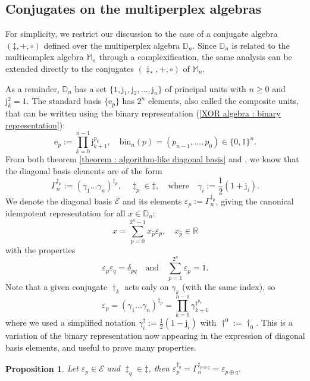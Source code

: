 \documentclass{article}
\newtheorem{proposition}[theorem]{Proposition}
\begin{document}
\subsection{Conjugates on the multiperplex algebras}

For simplicity, we restrict our discussion to the case of a conjugate algebra $(\ddagger, +, \circ)$ defined over the multiperplex algebra $\mathbb{D}_n$. Since $\mathbb{D}_n$ is related to the multicomplex algebra $\mathbb{M}_n$ through a complexification, the same analysis can be extended directly to the conjugates $(\ddagger_*, +,\circ)$ of $\mathbb{M}_n$.

As a reminder, $\mathbb{D}_n$ has a set $\{1, \mathrm{j}_1, \mathrm{j}_2, \ldots, \mathrm{j}_n\}$ of principal units with $n \geq 0$ and $\mathrm{j}_k^2 = 1$. The standard basis $\{ \mathrm{e}_p \}$ has $2^n$ elements, also called the composite units, that can be written using the binary representation (\ref{XOR algebra : binary representation}):
$$ \mathrm{e}_p := \prod_{k=0}^{n-1} \mathrm{j}_{k+1}^{p_k}, \quad \mathrm{bin}_n(p) = (p_{n-1}, \ldots, p_0) \in \{ 0,1 \}^n. $$
From both theorem \ref{theorem : algorithm-like diagonal basis} and \cite{courchesneAndTremblay2025}, we know that the diagonal basis elements are of the form
$$ \Gamma_n^{\ddagger_p} := (\gamma_1 \ldots \gamma_n)^{\ddagger_p}, \quad \ddagger_p \in \ddagger, \quad \text{where} \quad \gamma_i := \frac{1}{2}(1 + \mathrm{j}_i). $$
We denote the diagonal basis $\mathcal{E}$ and its elements $\varepsilon_p := \Gamma_n^{\ddagger_p}$, giving the canonical idempotent representation for all $x \in \mathbb{D}_n$: 
$$ x = \sum_{p=0}^{2^n-1} x_{\hat p} \varepsilon_p, \quad x_{\hat p} \in \mathbb{R} $$
with the properties
$$ \varepsilon_p \varepsilon_q = \delta_{pq} \quad \text{and} \quad \sum_{p=1}^{2^n} \varepsilon_p = 1. $$
Note that a given conjugate $\dagger_k$ acts only on $\gamma_k$ (with the same index), so
\begin{equation}
    \label{equation : binary representation for diagonal}
    \varepsilon_p = (\gamma_1 \ldots \gamma_n)^{\ddagger_p} = \prod_{k=0}^{n-1} \gamma_{k+1}^{\dagger^{p_k}}
\end{equation}
where we used a simplified notation $\gamma_i^{\dagger} := \frac{1}{2}(1 - \mathrm{j}_i)$ with $\dagger^0 := \dagger_0$. This is a variation of the binary representation now appearing in the expression of diagonal basis elements, and useful to prove many properties.
\begin{proposition}
    \label{proposition : diagonal basis and conjuagate XOR}
    Let $\varepsilon_p \in \mathcal{E}$ and $\ddagger_q \in \ddagger$, then $\varepsilon_p^{\ddagger_q} = \Gamma_n^{\ddagger_{p \oplus q}} = \varepsilon_{p \oplus q}.$
\end{proposition}
\end{document}
